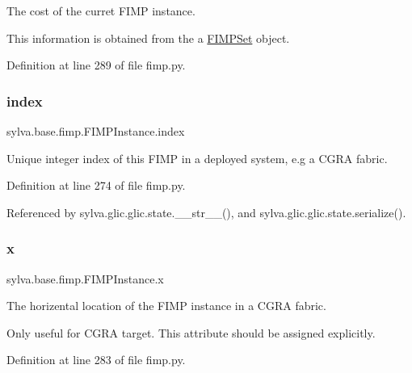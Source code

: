 The cost of the curret F\+I\+MP instance. 

This information is obtained from the a \hyperlink{classsylva_1_1base_1_1fimp_1_1_f_i_m_p_set}{F\+I\+M\+P\+Set} object. 

Definition at line 289 of file fimp.\+py.

\mbox{\label{classsylva_1_1base_1_1fimp_1_1_f_i_m_p_instance_af01c88ccee9642af4e8b488c6c574fad}} 
\subsubsection{\texorpdfstring{index}{index}}
{\footnotesize\ttfamily sylva.\+base.\+fimp.\+F\+I\+M\+P\+Instance.\+index}



Unique integer index of this F\+I\+MP in a deployed system, e.\+g a C\+G\+RA fabric. 



Definition at line 274 of file fimp.\+py.



Referenced by sylva.\+glic.\+glic.\+state.\+\_\+\+\_\+str\+\_\+\+\_\+(), and sylva.\+glic.\+glic.\+state.\+serialize().

\mbox{\label{classsylva_1_1base_1_1fimp_1_1_f_i_m_p_instance_aeb9f8a37a01046643a2c4e9fefae982d}} 
\subsubsection{\texorpdfstring{x}{x}}
{\footnotesize\ttfamily sylva.\+base.\+fimp.\+F\+I\+M\+P\+Instance.\+x}



The horizental location of the F\+I\+MP instance in a C\+G\+RA fabric. 

Only useful for C\+G\+RA target. This attribute should be assigned explicitly. 

Definition at line 283 of file fimp.\+py.




